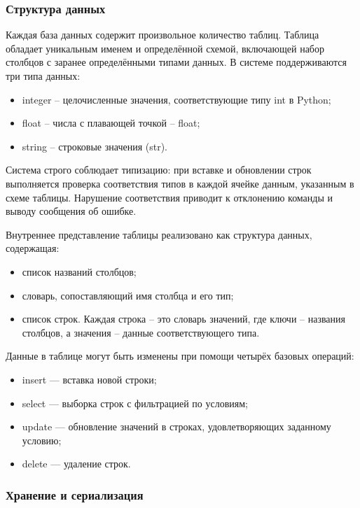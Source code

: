 \subsubsection{Структура данных}

Каждая база данных содержит произвольное количество таблиц. Таблица обладает уникальным именем и определённой схемой, включающей набор столбцов с заранее определёнными типами данных. В системе поддерживаются три типа данных:
\begin{itemize}
	\item integer -- целочисленные значения, соответствующие типу int в Python;
	\item float -- числа с плавающей точкой -- float;
	\item string -- строковые значения (str).
\end{itemize}

Система строго соблюдает типизацию: при вставке и обновлении строк выполняется проверка соответствия типов в каждой ячейке данным, указанным в схеме таблицы. Нарушение соответствия приводит к отклонению команды и выводу сообщения об ошибке.

Внутреннее представление таблицы реализовано как структура данных, содержащая:
\begin{itemize}
	\item список названий столбцов;	
	\item словарь, сопоставляющий имя столбца и его тип;	
	\item список строк. Каждая строка -- это словарь значений, где ключи -- названия столбцов, а значения -- данные соответствующего типа.
\end{itemize}

Данные в таблице могут быть изменены при помощи четырёх базовых операций:
\begin{itemize}
	\item insert — вставка новой строки;	
	\item select — выборка строк с фильтрацией по условиям;	
	\item update — обновление значений в строках, удовлетворяющих заданному условию;	
	\item delete — удаление строк.
\end{itemize}

\subsubsection{Хранение и сериализация}

